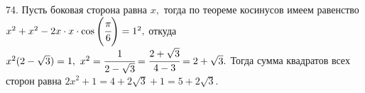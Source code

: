 74. Пусть боковая сторона равна $x,$ тогда по теореме косинусов имеем равенство $x^2+x^2-2x\cdot x\cdot \cos\left(\cfrac{\pi}{6}\right)=1^2,$ откуда $x^2(2-\sqrt{3})=1,\ x^2=\cfrac{1}{2-\sqrt{3}}=\cfrac{2+\sqrt{3}}{4-3}=2+\sqrt{3}.$ Тогда сумма квадратов всех сторон равна $2x^2+1=4+2\sqrt{3}+1=5+2\sqrt{3}.$\\
